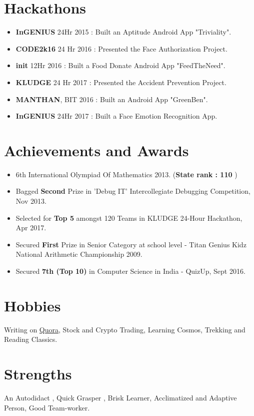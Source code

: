 \documentclass[margin, centered]{res}
\begin{document}
\begin{resume}
\section{Hackathons}
\begin{itemize}[leftmargin=*]
 \item \textbf{{InGENIUS}} 24Hr 2015 : Built an Aptitude Android App "Triviality". 
 \item \textbf{{CODE2k16}} 24 Hr 2016 : Presented the Face Authorization Project.
 \item \textbf{{init}} 12Hr 2016 : Built a Food Donate Android App "FeedTheNeed".
 \item \textbf{{KLUDGE}} 24 Hr 2017 : Presented the Accident Prevention Project. 
 \item \textbf{{MANTHAN}}, BIT 2016 : Built an Android App "GreenBen". 
 \item \textbf{{InGENIUS}} 24Hr 2017 : Built a Face Emotion Recognition App.
\end{itemize}


\section{Achievements and Awards}
\begin{itemize}[leftmargin=*]
 \item 6th International Olympiad Of Mathematics 2013. (\textbf{{State rank : 110}} )
 \item Bagged \textbf{{Second}} Prize in 'Debug IT' Intercollegiate Debugging Competition, Nov 2013.
 \item Selected for \textbf{{Top 5}} amongst 120 Teams in KLUDGE 24-Hour Hackathon, Apr 2017.
 \item Secured \textbf{{First}} Prize in Senior Category at school level - Titan Genius Kidz National
Arithmetic Championship 2009.
 \item Secured \textbf{{7th (Top 10)}} in Computer Science in India - QuizUp, Sept 2016.
\end{itemize}



\section{Hobbies}
Writing on \href{https://www.quora.com/profile/Sharath-Guna-1}{Quora}, Stock and Crypto Trading, Learning Cosmos, Trekking and Reading Classics.

\section{Strengths}
An Autodidact , Quick Grasper , Brisk Learner, Acclimatized and Adaptive Person, Good Team-worker.

\end{resume}
\end{document}
